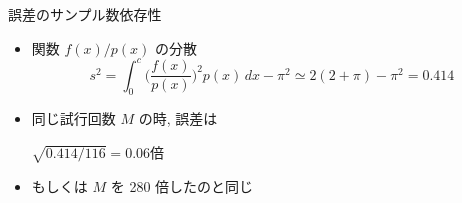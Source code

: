 \begin{frame}[t,fragile]{誤差のサンプル数依存性}
  \begin{itemize}
    \setlength{\itemsep}{1em}
  \item 関数 $f(x)/p(x)$ の分散
    \[
    s^2 = \int_0^c \Big(\frac{f(x)}{p(x)}\Big)^2 p(x) \, dx - \pi^2 \simeq 2(2+\pi) - \pi^2 = 0.414
    \]
  \item 同じ試行回数 $M$ の時, 誤差は

    $\sqrt{0.414/116} = 0.06 \mbox{倍}$

  \item もしくは $M$ を 280 倍したのと同じ
  \vspace*{-5em}
  \hspace*{15em}
  \end{itemize}
\end{frame}
